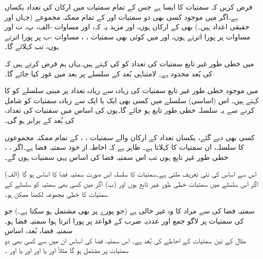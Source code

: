 فرض کریں کہ  سمتیات کا ایسا  ہے جس کے تمام سمتیات میں ارکان کی تعداد یکساں ہے۔اگر  میں موجود  کسی بھی دو سمتیات  اور   کے تمام ممکنہ مجموعے  (جہاں  اور  حقیقی اعداد ہیں۔) بھی  کے ارکان ہوں، اور مزید یہ کہ،  اور  مساوات -الف، پ، ت اور مساوات  پر پورا اترتے ہوں، اور  میں کوئی بھی سمتیات ، ،  مساوات -ب پر پورا اترتے ہوں، تب   کہلائے گا۔

 میں خطی طور غیر تابع سمتیات کی تعداد کو  کی  کہتے ہیں۔یہاں ہم فرض کرتے ہیں کہ  کی بُعد محدود ہے۔ لامتناہی بُعد کے سلسلے پر بعد میں غور کیا جائے گا۔

 میں موجود خطی طور غیر تابع سمتیات کی زیادہ سے زیادہ تعداد پر مبنی سلسلے کو  کا  کہتے ہیں۔  اس (اساسی) سلسلے میں کسی بھی ایک یا ایک سے زیادہ سمتیات کو شامل کرنے سے یہ سلسلہ خطی طور تابع ہو جائے گا۔یوں  کی اساس میں سمتیات کی تعداد،  کی بُعد کے برابر ہو گی۔

کسی بھی دیے گئے، یکساں تعداد کے ارکان والے سمتیات ، ، کے تمام ممکنہ مجموعوں کا سلسلہ،  ان سمتیات کا  کہلاتا ہے۔ ظاہر ہے کہ احاطہ از خود سمتیہ فضا ہے۔اگر  ، ، خطی طور غیر تابع ہوں تب اس سمتیہ فضا کی اساس یہی سمتیات ہوں گے۔

اس سے اساس کی نئی تعریف ملتی ہے۔سمتیات کا سلسلہ اس صورت سمتیہ فضا  کا اساس ہو گا  (الف) اگر اس سلسلے میں سمتیات خطی طور غیر تابع ہوں اور (ب) اگر  میں کسی بھی سمتیہ کو سلسلے کے سمتیات کا خطی مجموعہ لکھنا ممکن ہو۔

سمتیہ فضا کی  سے مراد  کا وہ غیر خالی  ہے (جو پورے  پر بھی مشتمل ہو سکتا ہے۔) جو  کی سمتیات پر لاگو جمع اور عددیہ ضرب کے قواعد پر پورا اترتا ہوا سمتیہ فضا ہو۔
\quad سمتیہ فضا، بُعد، اساس\\
مثال  کے تین سمتیات کے احاطے کی بُعد  ہے۔ اس سمتیہ فضا کی اساس ان میں سے کسی بھی دو سمتیات پر مشتمل ہو گا مثلاً  اور  یا  اور  اور یا  اور ۔

